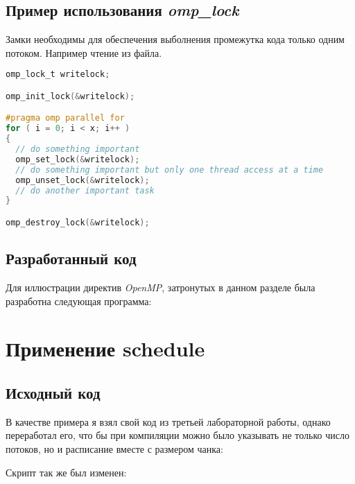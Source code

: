 \documentclass[a4paper, 12pt]{article}
\begin{document}
\subsection{Пример использования \textit{omp\_lock}}

Замки необходимы для обеспечения выболнения промежутка кода только одним потоком.
Например чтение из файла.

\begin{lstlisting}[language=C]
omp_lock_t writelock;

omp_init_lock(&writelock);

#pragma omp parallel for
for ( i = 0; i < x; i++ )
{
  // do something important
  omp_set_lock(&writelock);
  // do something important but only one thread access at a time
  omp_unset_lock(&writelock);
  // do another important task
}

omp_destroy_lock(&writelock);
\end{lstlisting}

\subsection{Разработанный код}

Для иллюстрации директив \textit{OpenMP}, затронутых в данном разделе была разработна следующая программа:

\vspace{0.5cm}



\section{Применение schedule}

\subsection{Исходный код}

В качестве примера я взял свой код из третьей лабораторной работы, однако переработал его, что бы при компиляции можно было указывать не только число потоков, но и расписание вместе с размером чанка:


\vspace{0.5cm}

Скрипт так же был изменен:


\vspace{0.5cm}
\end{document}
